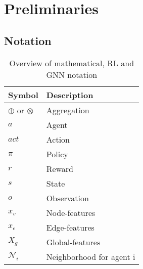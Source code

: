 
\chapter{Preliminaries}
\label{ch:Preliminaries}

\section{Notation}

\newcommand{\agent}{a}
\newcommand{\actions}{A}
\newcommand{\action}{act}
\newcommand{\policy}{pi}
\newcommand{\observation}{o}
\newcommand{\observations}{O}
\newcommand{\advantage}{A}
\newcommand{\reward}{r}
\newcommand{\state}{s}
\newcommand{\states}{S}
\newcommand{\graph}{G}
\newcommand{\nodes}{V}
\newcommand{\node}{v}
\newcommand{\nodefeatures}{X_v}
\newcommand{\nodefeature}{x_v}
\newcommand{\edges}{E}
\newcommand{\edge}{e}
\newcommand{\edgefeatures}{X_e}
\newcommand{\edgefeature}{x_e}
\newcommand{\globalfeatures}{X_g}
\newcommand{\globalfeature}{x_g}
\newcommand{\neighborhood}{N}

\begin{table}[ht!]
	\caption{Overview of mathematical, RL and GNN notation}
	\vspace*{0.5cm}
	\centering
	\begin{tabular}{ll}
		\toprule
		Symbol & Description \\
		\midrule
		$\oplus$ or $\otimes$ & Aggregation \\
		\midrule
		$\agent$ & Agent \\
		$\action$ & Action \\
		$\pi$ & Policy \\
		$\reward$ & Reward \\
		$\state$ & State \\
		$\observation$ & Observation \\
		\midrule
		$\nodefeature$ & Node-features \\
		$\edgefeature$ & Edge-features \\
		$\globalfeatures$ & Global-features \\
		$\mathcal{\neighborhood}_i$ & Neighborhood for agent i \\
		\bottomrule
	\end{tabular}
	\label{tab:macros}
\end{table}


